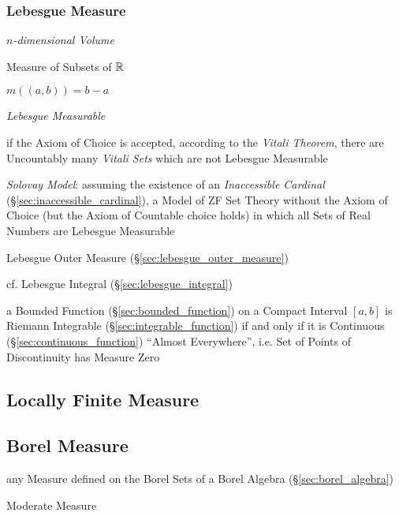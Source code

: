 \subsubsection{Lebesgue Measure}\label{sec:lebesgue_measure}

\emph{$n$-dimensional Volume}

Measure of Subsets of $\mathbb{R}$

$m((a,b)) = b - a$

\emph{Lebesgue Measurable}

if the Axiom of Choice is accepted, according to the \emph{Vitali Theorem},
there are Uncountably many \emph{Vitali Sets} which are not Lebesgue Measurable

\emph{Solovay Model}: assuming the existence of an \emph{Inaccessible Cardinal}
(\S\ref{sec:inaccessible_cardinal}), a Model of ZF Set Theory without the Axiom
of Choice (but the Axiom of Countable choice holds) in which all Sets of Real
Numbers are Lebesgue Measurable

Lebesgue Outer Measure (\S\ref{sec:lebesgue_outer_measure})

cf. Lebesgue Integral (\S\ref{sec:lebesgue_integral})

a Bounded Function (\S\ref{sec:bounded_function}) on a Compact Interval $[a,b]$
is Riemann Integrable (\S\ref{sec:integrable_function}) if and only if it is
Continuous (\S\ref{sec:continuous_function}) ``Almost Everywhere'', i.e. Set of
Points of Discontinuity has Measure Zero



\subsection{Locally Finite Measure}\label{sec:locally_finite_measure}

\subsection{Borel Measure}\label{sec:borel_measure}

any Measure defined on the Borel Sets of a Borel Algebra
(\S\ref{sec:borel_algebra})

Moderate Measure



